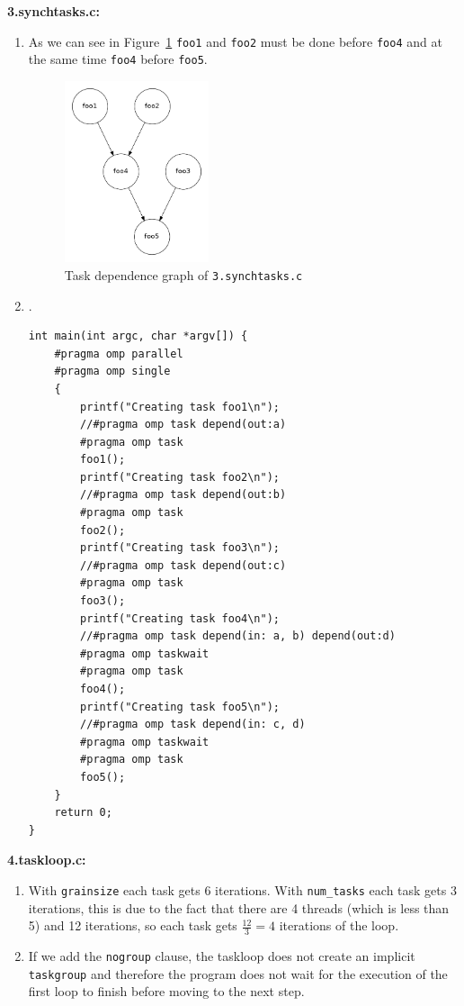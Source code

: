 \begin{enumerate}[label=\Alph*)]
\begin{enumerate}[label=\arabic*.]
    \end{enumerate}
    \textbf{3.synchtasks.c:}
    \begin{enumerate}[label=\arabic*.]
        \item As we can see in Figure~\ref{graph:3synchtasks} \texttt{foo1} and \texttt{foo2} must be done before \texttt{foo4} and at the same time \texttt{foo4} before \texttt{foo5}.
        \begin{figure}[h!]
        \centering
        \includegraphics[width=0.4\textwidth]{3.synchtasks_taskDependence.png}
        \caption{Task dependence graph of \texttt{3.synchtasks.c}}
        \label{graph:3synchtasks}
        \end{figure}
        \item .
        
        \begin{verbatim}
int main(int argc, char *argv[]) {
    #pragma omp parallel
    #pragma omp single
    {
    	printf("Creating task foo1\n");
    	//#pragma omp task depend(out:a)
        #pragma omp task
    	foo1();
    	printf("Creating task foo2\n");
    	//#pragma omp task depend(out:b)
        #pragma omp task
    	foo2();
    	printf("Creating task foo3\n");
    	//#pragma omp task depend(out:c)
        #pragma omp task
    	foo3();
    	printf("Creating task foo4\n");
    	//#pragma omp task depend(in: a, b) depend(out:d)
        #pragma omp taskwait
        #pragma omp task
    	foo4();
    	printf("Creating task foo5\n");
    	//#pragma omp task depend(in: c, d)
        #pragma omp taskwait
        #pragma omp task
    	foo5();
    }
    return 0;
}
        \end{verbatim}
    \end{enumerate}
    \textbf{4.taskloop.c:}
    \begin{enumerate}[label=\arabic*.]
        \item With \texttt{grainsize} each task gets 6 iterations.
        With \texttt{num\_tasks} each task gets 3 iterations, this is due to the fact that there are 4 threads (which is less
        than 5) and 12 iterations, so each task gets $\frac{12}{3} = 4$ iterations of the loop.
        \item If we add the \texttt{nogroup} clause, the taskloop does not create an implicit \texttt{taskgroup} and therefore the program
        does not wait for the execution of the first loop to finish before moving to the next step.
    \end{enumerate}
\end{enumerate}

